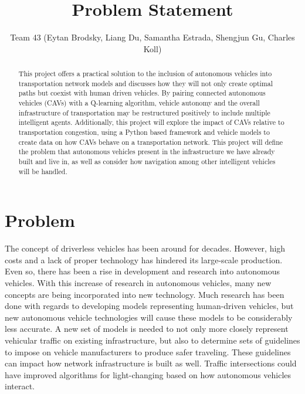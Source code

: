 \documentclass[10pt,letterpaper,draftclsnofoot,onecolumn]{IEEEtran}
\begin{document}
\author{Team 43 (Eytan Brodsky, Liang Du, Samantha Estrada, Shengjun Gu, Charles Koll)}
\title{Problem Statement}

\maketitle

\begin{abstract}
This project offers a practical solution to the inclusion of autonomous vehicles into transportation network models and discusses how they will not only create optimal paths but coexist with human driven vehicles. By pairing connected autonomous vehicles (CAVs) with a Q-learning algorithm, vehicle autonomy and the overall infrastructure of transportation may be restructured positively to include multiple intelligent agents. Additionally, this project will explore the impact of CAVs relative to transportation congestion, using a Python based framework and vehicle models to create data on how CAVs behave on a transportation network. This project will define the problem that autonomous vehicles present in the infrastructure we have already built and live in, as well as consider how navigation among other intelligent vehicles will be handled.
\end{abstract}

\pagebreak

\section{Problem}
The concept of driverless vehicles has been around for decades. However, high costs and a lack of proper technology has hindered its large-scale production. Even so, there has been a rise in development and research into autonomous vehicles. With this increase of research in autonomous vehicles, many new concepts are being incorporated into new technology. Much research has been done with regards to developing models representing human-driven vehicles, but new autonomous vehicle technologies will cause these models to be considerably less accurate. A new set of models is needed to not only more closely represent vehicular traffic on existing infrastructure, but also to determine sets of guidelines to impose on vehicle manufacturers to produce safer traveling. These guidelines can impact how network infrastructure is built as well. Traffic intersections could have improved algorithms for light-changing based on how autonomous vehicles interact.
\end{document}
